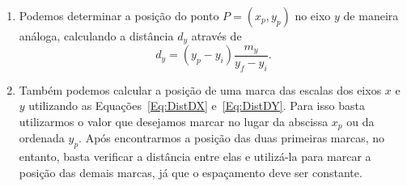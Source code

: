 \begin{enumerate}
	Vamos considerar, por exemplo, um conjunto de dados cujas abscissas correspondem a uma variável $t$, cujas unidades são segundos. Verificamos que o menor valor de abscissa para os pontos é  e o maior . Todas as abscissas estão compreendidas entre  e  e podemos escolher tais valores\footnote[][-1cm]{Outra escolha possível seria entre  e . No entanto, devemos tomar cuidado com a escolha pois alguns pontos podem ficar muito próximos dos eixos, dificultando a leitura do gráfico.} como o início e o fim do eixo $x$. A medida do eixo no gráfico é $m_x = \np[cm]{25,00}$. Assim, se desejamos encontrar a distância $d_x$ a partir do início do eixo em que devemos marcar um ponto cuja abscissa é $x_p=\np[s]{47,20}$ temos
	\begin{align}
		d_x &= (\np{47,20} - 30)\frac{25,00}{110 - 30} \\
		  &= \numprint[cm]{5,375}.
	\end{align}
	\item Podemos determinar a posição do ponto $P = (x_p,y_p)$ no eixo $y$ de maneira análoga, calculando a distância $d_y$ através de
		\begin{equation}\label{Eq:DistDY}
			d_y = (y_p-y_i)\frac{m_y}{y_f-y_i}.
		\end{equation}
	\item Também podemos calcular a posição de uma marca das escalas dos eixos $x$ e $y$ utilizando as Equações~\eqref{Eq:DistDX} e~\eqref{Eq:DistDY}. Para isso basta utilizarmos o valor que desejamos marcar no lugar da abscissa $x_p$ ou da ordenada $y_p$. Após encontrarmos a posição das duas primeiras marcas, no entanto, basta verificar a distância entre elas e utilizá-la para marcar a posição das demais marcas, já que o espaçamento deve ser constante.
\end{enumerate}

